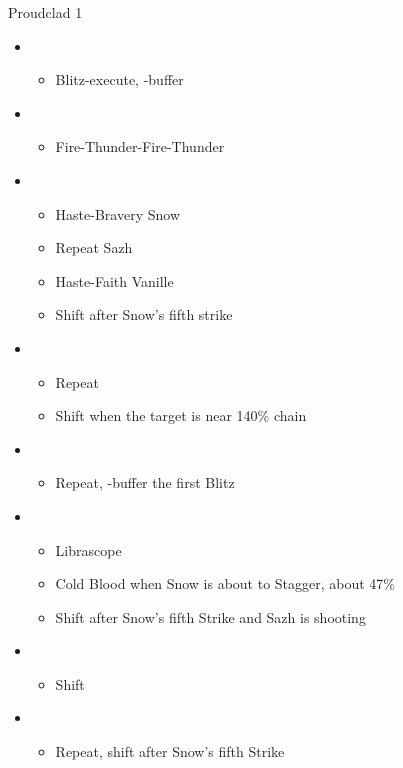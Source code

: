 \begin{multicols}{2}
\begin{battle}{Proudclad 1}
\begin{itemize}
    \item \second
    \begin{itemize}
        \item Blitz-execute, \rav-buffer
    \end{itemize}
    \item \sixth
    \begin{itemize}
        \item Fire-Thunder-Fire-Thunder
    \end{itemize}
    \item \fourth
    \begin{itemize}
        \item Haste-Bravery Snow
        \item Repeat Sazh
        \item Haste-Faith Vanille
        \item Shift after Snow's fifth strike
    \end{itemize}
    \item \sixth
    \begin{itemize}
        \item Repeat
        \item Shift when the target is near 140\% chain
    \end{itemize}
    \item \first
    \begin{itemize}
        \item Repeat, \rav-buffer the first Blitz
    \end{itemize}
    \item \fifth
    \begin{itemize}
        \item Librascope
        \item Cold Blood when Snow is about to Stagger, about 47\%
        \item Shift after Snow's fifth Strike and Sazh is shooting
    \end{itemize}
    \item \sixth
    \begin{itemize}
        \item Shift
    \end{itemize}
    \item \fifth
    \begin{itemize}
        \item Repeat, shift after Snow's fifth Strike

\end{itemize}
\end{itemize}
\end{battle}
\end{multicols}
